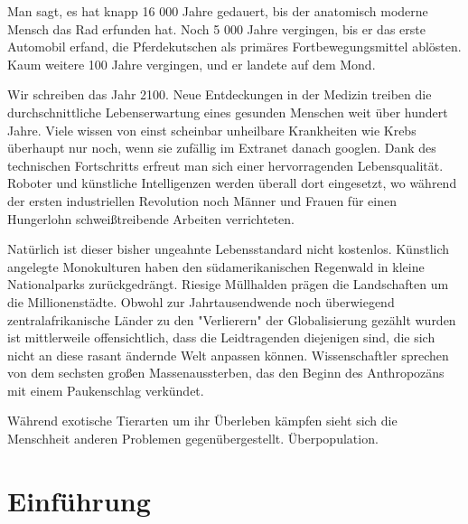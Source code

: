 Man sagt, es hat knapp 16 000 Jahre gedauert, bis der anatomisch moderne Mensch das Rad erfunden hat.
Noch 5 000 Jahre vergingen, bis er das erste Automobil erfand, die Pferdekutschen als primäres Fortbewegungsmittel ablösten.
Kaum weitere 100 Jahre vergingen, und er landete auf dem Mond.

Wir schreiben das Jahr 2100.
Neue Entdeckungen in der Medizin treiben die durchschnittliche Lebenserwartung eines gesunden Menschen weit über hundert Jahre.
Viele wissen von einst scheinbar unheilbare Krankheiten wie Krebs überhaupt nur noch, wenn sie zufällig im Extranet danach googlen.
Dank des technischen Fortschritts erfreut man sich einer hervorragenden Lebensqualität.
Roboter und künstliche Intelligenzen werden überall dort eingesetzt,
wo während der ersten industriellen Revolution noch Männer und Frauen für einen Hungerlohn schweißtreibende Arbeiten verrichteten.

Natürlich ist dieser bisher ungeahnte Lebensstandard nicht kostenlos. Künstlich angelegte Monokulturen haben den südamerikanischen Regenwald in kleine Nationalparks zurückgedrängt.
Riesige Müllhalden prägen die Landschaften um die Millionenstädte. Obwohl zur Jahrtausendwende noch überwiegend zentralafrikanische Länder zu den "Verlierern" der Globalisierung gezählt wurden
ist mittlerweile offensichtlich, dass die Leidtragenden diejenigen sind, die sich nicht an diese rasant ändernde Welt anpassen können.
Wissenschaftler sprechen von dem sechsten großen Massenaussterben, das den Beginn des Anthropozäns mit einem Paukenschlag verkündet.

Während exotische Tierarten um ihr Überleben kämpfen sieht sich die Menschheit anderen Problemen gegenübergestellt. Überpopulation. 


\section{Einführung}
